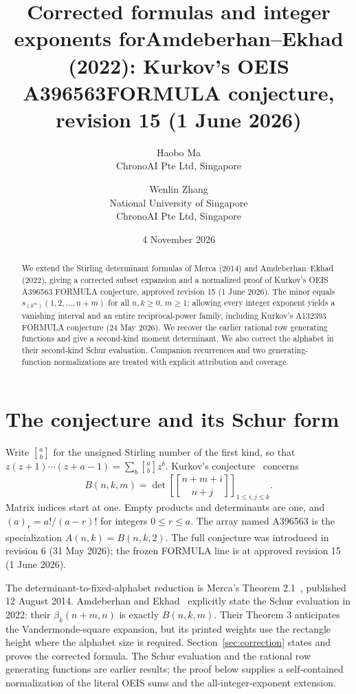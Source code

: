 \documentclass[11pt]{article}
\title{\Large Corrected formulas and integer exponents for\newline Amdeberhan--Ekhad (2022): Kurkov's OEIS A396563\newline FORMULA conjecture, revision 15 (1 June 2026)}
\author{Haobo Ma\\\small ChronoAI Pte Ltd, Singapore
\and Wenlin Zhang\\\small National University of Singapore\\\small ChronoAI Pte Ltd, Singapore}
\date{4 November 2026}
\newcommand{\stir}[2]{\genfrac{[}{]}{0pt}{}{#1}{#2}}
\newcommand{\Schur}{s}
\begin{document}
\maketitle
\begin{abstract}
We extend the Stirling determinant formulas of Merca (2014) and
Amdeberhan--Ekhad (2022), giving a corrected subset expansion and a normalized
proof of Kurkov's OEIS A396563 FORMULA conjecture, approved revision 15
(1 June 2026). The minor equals $\Schur_{(k^m)}(1,2,\ldots,n+m)$ for all
$n,k\geq0$, $m\geq1$; allowing every integer exponent yields a vanishing
interval and an entire reciprocal-power family, including Kurkov's A132393
FORMULA conjecture (24 May 2026). We recover the earlier rational row
generating functions and give a second-kind moment determinant.
We also correct the alphabet in their second-kind Schur evaluation.
Companion recurrences and two generating-function normalizations are
treated with explicit attribution and coverage.
\end{abstract}

\section{The conjecture and its Schur form}
Write $\stir ab$ for the unsigned Stirling number of the first kind, so that
$z(z+1)\cdots(z+a-1)=\sum_b\stir ab z^b$.
Kurkov's conjecture~\cite{kurkov} concerns
\begin{equation}\label{eq:minor}
B(n,k,m)=\det\left[\stir{n+m+i}{n+j}\right]_{1\leq i,j\leq k}.
\end{equation}
Matrix indices start at one. Empty products and determinants are one, and
$(a)_{\underline r}=a!/(a-r)!$ for integers $0\leq r\leq a$.
The array named A396563 is the specialization $A(n,k)=B(n,k,2)$.
The full conjecture was introduced in revision 6 (31 May 2026);
the frozen FORMULA line is at approved revision 15 (1 June 2026).

The determinant-to-fixed-alphabet reduction is Merca's
Theorem 2.1~\cite{merca}, published 12 August 2014.
Amdeberhan and Ekhad~\cite[Theorem 2]{ae} explicitly state the Schur evaluation
in 2022: their $\beta_k(n+m,n)$ is exactly $B(n,k,m)$.
Their Theorem 3 anticipates the Vandermonde-square expansion, but its printed
weights use the rectangle height where the alphabet size is required.
Section~\ref{sec:correction} states and proves the corrected formula.
The Schur evaluation and the rational row generating functions are earlier
results; the proof below supplies a self-contained normalization of the
literal OEIS sums and the all-integer-exponent extension.
\end{document}

